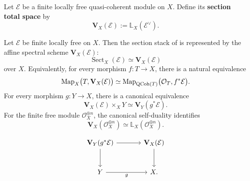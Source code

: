 \begin{definition}
\label{def:vector-bundle-dual-convention}
Let \(\mathcal E\) be a finite locally free quasi-coherent module on \(X\).
Define its \textbf{section total space} by
\[
    \mathbf V_X(\mathcal E)
    :=
    \mathbb L_X(\mathcal E^\vee).
\]
\end{definition}

\begin{proposition}
\label{prop:vector-bundle-total-space-sections}
Let \(\mathcal E\) be finite locally free on \(X\). Then the section stack
of  is represented by the affine spectral scheme
\(\mathbf V_X(\mathcal E)\):
\[
    \operatorname{Sect}_X(\mathcal E)
    \simeq
    \mathbf V_X(\mathcal E)
\]
over \(X\). Equivalently, for every morphism \(f:T\to X\), there is a
natural equivalence
\[
    \operatorname{Map}_X\bigl(T,\mathbf V_X(\mathcal E)\bigr)
    \simeq
    \operatorname{Map}_{\operatorname{QCoh}(T)}
    \bigl(\mathcal O_T,f^*\mathcal E\bigr).
\]
For every morphism \(g:Y\to X\), there is a canonical equivalence
\[
    \mathbf V_X(\mathcal E)\times_XY
    \simeq
    \mathbf V_Y(g^*\mathcal E).
\]
For the finite free module \(\mathcal O_X^{\oplus n}\), the canonical
self-duality identifies
\[
    \mathbf V_X(\mathcal O_X^{\oplus n})
    \simeq
    \mathbb L_X(\mathcal O_X^{\oplus n}).
\]
\end{proposition}

\[
\begin{tikzcd}[column sep=large, row sep=large]
    \mathbf V_Y(g^*\mathcal E)
        \arrow[r]
        \arrow[d]
    &
    \mathbf V_X(\mathcal E)
        \arrow[d]
    \\
    Y
        \arrow[r, "g"']
    &
    X.
\end{tikzcd}
\]


